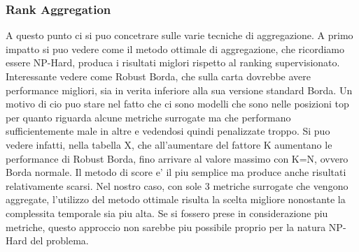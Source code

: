 \subsubsection{Rank Aggregation}
A questo punto ci si puo concetrare sulle varie tecniche di aggregazione. A primo impatto si puo vedere come il metodo ottimale di aggregazione, che ricordiamo essere NP-Hard, produca i risultati miglori rispetto al ranking supervisionato. Interessante vedere come Robust Borda, che sulla carta dovrebbe avere performance migliori, sia in verita inferiore alla sua versione standard Borda. Un motivo di cio puo stare nel fatto che ci sono modelli che sono nelle posizioni top per quanto riguarda alcune metriche surrogate ma che performano sufficientemente male in altre e vedendosi quindi penalizzate troppo.
Si puo vedere infatti, nella tabella X, che all'aumentare del fattore K aumentano le performance di Robust Borda, fino arrivare al valore massimo con K=N, ovvero Borda normale.
Il metodo di score e' il piu semplice ma produce anche risultati relativamente scarsi. Nel nostro caso, con sole 3 metriche surrogate che vengono aggregate, l'utilizzo del metodo ottimale risulta la scelta migliore nonostante la complessita temporale sia piu alta. Se si fossero prese in considerazione piu metriche, questo approccio non sarebbe piu possibile proprio per la natura NP-Hard del problema.
